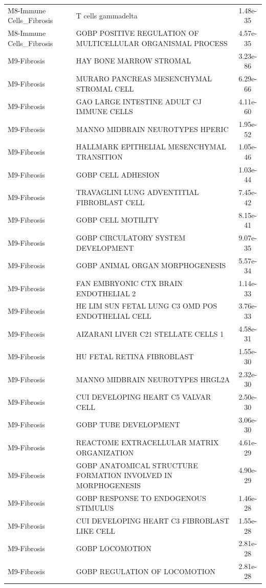 \documentclass[
]{article}
\begin{document}
\begin{singlespace}
\begin{longtable}[t]{>{\raggedright\arraybackslash}p{1.4in}>{\raggedright\arraybackslash}p{4.5in}c}
M8-Immune Cells\_Fibrosis & T cells gammadelta & 1.48e-35\\
M8-Immune Cells\_Fibrosis & GOBP POSITIVE REGULATION OF MULTICELLULAR ORGANISMAL PROCESS & 4.57e-35\\
\addlinespace
M9-Fibrosis & HAY BONE MARROW STROMAL & 3.23e-86\\
M9-Fibrosis & MURARO PANCREAS MESENCHYMAL STROMAL CELL & 6.29e-66\\
M9-Fibrosis & GAO LARGE INTESTINE ADULT CJ IMMUNE CELLS & 4.11e-60\\
M9-Fibrosis & MANNO MIDBRAIN NEUROTYPES HPERIC & 1.95e-52\\
M9-Fibrosis & HALLMARK EPITHELIAL MESENCHYMAL TRANSITION & 1.05e-46\\
\addlinespace
M9-Fibrosis & GOBP CELL ADHESION & 1.03e-44\\
M9-Fibrosis & TRAVAGLINI LUNG ADVENTITIAL FIBROBLAST CELL & 7.45e-42\\
M9-Fibrosis & GOBP CELL MOTILITY & 8.15e-41\\
M9-Fibrosis & GOBP CIRCULATORY SYSTEM DEVELOPMENT & 9.07e-35\\
M9-Fibrosis & GOBP ANIMAL ORGAN MORPHOGENESIS & 5.57e-34\\
\addlinespace
M9-Fibrosis & FAN EMBRYONIC CTX BRAIN ENDOTHELIAL 2 & 1.14e-33\\
M9-Fibrosis & HE LIM SUN FETAL LUNG C3 OMD POS ENDOTHELIAL CELL & 3.76e-33\\
M9-Fibrosis & AIZARANI LIVER C21 STELLATE CELLS 1 & 4.58e-31\\
M9-Fibrosis & HU FETAL RETINA FIBROBLAST & 1.55e-30\\
M9-Fibrosis & MANNO MIDBRAIN NEUROTYPES HRGL2A & 2.32e-30\\
\addlinespace
M9-Fibrosis & CUI DEVELOPING HEART C5 VALVAR CELL & 2.50e-30\\
M9-Fibrosis & GOBP TUBE DEVELOPMENT & 3.06e-30\\
M9-Fibrosis & REACTOME EXTRACELLULAR MATRIX ORGANIZATION & 4.61e-29\\
M9-Fibrosis & GOBP ANATOMICAL STRUCTURE FORMATION INVOLVED IN MORPHOGENESIS & 4.90e-29\\
M9-Fibrosis & GOBP RESPONSE TO ENDOGENOUS STIMULUS & 1.46e-28\\
\addlinespace
M9-Fibrosis & CUI DEVELOPING HEART C3 FIBROBLAST LIKE CELL & 1.55e-28\\
M9-Fibrosis & GOBP LOCOMOTION & 2.81e-28\\
M9-Fibrosis & GOBP REGULATION OF LOCOMOTION & 2.81e-28\\

\end{longtable}
\end{singlespace}
\end{document}
